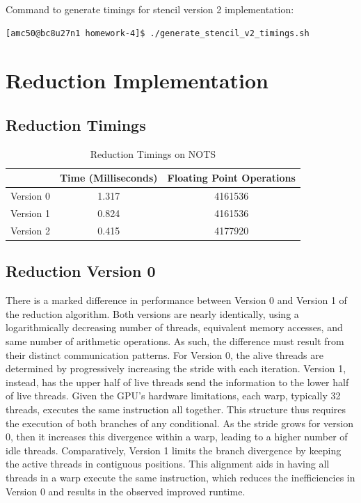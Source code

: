 \documentclass{article}
\begin{document}
\bigskip
\noindent
Command to generate timings for stencil version 2 implementation:
\begin{verbatim}
[amc50@bc8u27n1 homework-4]$ ./generate_stencil_v2_timings.sh 
\end{verbatim}

\section{Reduction Implementation}

\subsection{Reduction Timings}
\begin{table}[ht!]
    \caption{Reduction Timings on NOTS}
    \centering
    \begin{tabular}{|c|c|c|}
        \hline
         & Time (Milliseconds) & Floating Point Operations  \\
        \hline
        Version 0 & 1.317 & 4161536 \\
        \hline
        Version 1 & 0.824 & 4161536 \\
        \hline
        Version 2 & 0.415 & 4177920 \\
        \hline
    \end{tabular}
\end{table}

\subsection{Reduction Version 0}

There is a marked difference in performance between Version 0 and Version 1 of the reduction algorithm. Both versions are nearly identically, using a logarithmically decreasing number of threads, equivalent memory accesses, and same number of arithmetic operations. As such, the difference must result from their distinct communication patterns. For Version 0, the alive threads are determined by progressively increasing the stride with each iteration. Version 1, instead, has the upper half of live threads send the information to the lower half of live threads. Given the GPU's hardware limitations, each warp, typically 32 threads, executes the same instruction all together. This structure thus requires the execution of both branches of any conditional. As the stride grows for version 0, then it increases this divergence within a warp, leading to a higher number of idle threads. Comparatively, Version 1 limits the branch divergence by keeping the active threads in contiguous positions. This alignment aids in having all threads in a warp execute the same instruction, which reduces the inefficiencies in Version 0 and results in the observed improved runtime. 
\end{document}
